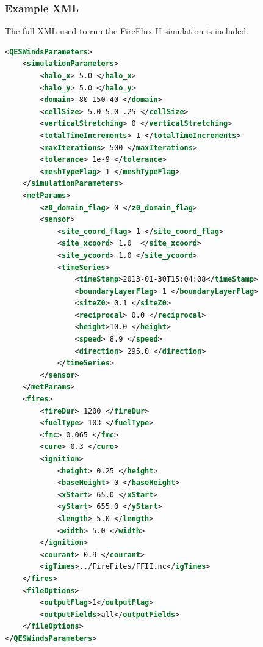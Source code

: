 \subsubsection{Example XML}
The full XML used to run the FireFlux II simulation is included.
\begin{lstlisting}[language=XML]
<QESWindsParameters>
    <simulationParameters>
        <halo_x> 5.0 </halo_x>
        <halo_y> 5.0 </halo_y>
        <domain> 80 150 40 </domain>
        <cellSize> 5.0 5.0 .25 </cellSize>
        <verticalStretching> 0 </verticalStretching>
        <totalTimeIncrements> 1 </totalTimeIncrements>
        <maxIterations> 500 </maxIterations>
        <tolerance> 1e-9 </tolerance>
        <meshTypeFlag> 1 </meshTypeFlag>
    </simulationParameters>
    <metParams>
        <z0_domain_flag> 0 </z0_domain_flag>
        <sensor>
            <site_coord_flag> 1 </site_coord_flag>
            <site_xcoord> 1.0  </site_xcoord>
            <site_ycoord> 1.0 </site_ycoord>
            <timeSeries>
                <timeStamp>2013-01-30T15:04:08</timeStamp>
                <boundaryLayerFlag> 1 </boundaryLayerFlag>
                <siteZ0> 0.1 </siteZ0>
                <reciprocal> 0.0 </reciprocal>
                <height>10.0 </height>
                <speed> 8.9 </speed>
                <direction> 295.0 </direction>
            </timeSeries>
        </sensor>
    </metParams>
    <fires>
        <fireDur> 1200 </fireDur>
        <fuelType> 103 </fuelType>
        <fmc> 0.065 </fmc>
        <cure> 0.3 </cure>
        <ignition>
            <height> 0.25 </height>
            <baseHeight> 0 </baseHeight>
            <xStart> 65.0 </xStart>
            <yStart> 655.0 </yStart>
            <length> 5.0 </length>
            <width> 5.0 </width>
        </ignition>
        <courant> 0.9 </courant>
        <igTimes>../FireFiles/FFII.nc</igTimes>
    </fires>
    <fileOptions>
        <outputFlag>1</outputFlag>
        <outputFields>all</outputFields>
    </fileOptions>
</QESWindsParameters>
\end{lstlisting}
